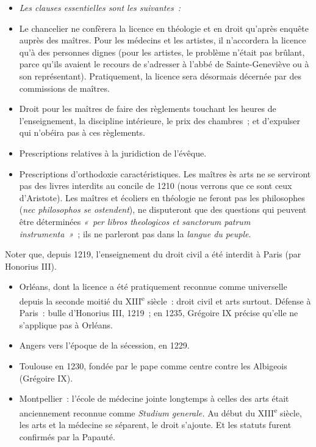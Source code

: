 \documentclass[french,twoside]{book} %
\newlength{\listmod}
\newcommand{\listhead}[1]{\hspace{-1\listmod}\emph{#1}}
\begin{document}
\begin{itemize}[itemsep=0pt,]
\item[]\listhead{Les clauses essentielles sont les suivantes :}
\item Le chancelier ne confèrera la licence en théologie et en droit qu’après enquête auprès des maîtres. Pour les médecins et les artistes, il n’accordera la licence qu’à des personnes dignes (pour les artistes, le problème n’était pas brûlant, parce qu’ils avaient le recours de s’adresser à l’abbé de Sainte-Geneviève ou à son représentant). Pratiquement, la licence sera désormais décernée par des commissions de maîtres.
\item Droit pour les maîtres de faire des règlements touchant les heures de l’enseignement, la discipline intérieure, le prix des chambres ; et d’expulser qui n’obéira pas à ces règlements.
\item Prescriptions relatives à la juridiction de l’évêque.
\item Prescriptions d’orthodoxie caractéristiques. Les maîtres ès arts ne se serviront pas des livres interdits au concile de 1210 (nous verrons que ce sont ceux d’Aristote). Les maîtres et écoliers en théologie ne feront pas les philosophes ({\itshape nec philosophos se ostendent}), ne disputeront que des questions qui peuvent être déterminées \emph{« per libros theologicos et sanctorum patrum instrumenta »} ; ils ne parleront pas dans la \emph{langue du peuple}.
\end{itemize}

\noindent Noter que, depuis 1219, l’enseignement du droit civil a été interdit à Paris (par Honorius III).\par

\begin{itemize}[itemsep=0pt,]
\item Orléans, dont la licence a été pratiquement reconnue comme universelle depuis la seconde moitié du XIII\textsuperscript{e} siècle : droit civil et  
\label{p117} arts surtout. Défense à Paris : bulle d’Honorius III, 1219 ; en 1235, Grégoire IX précise qu’elle ne s’applique pas à Orléans.
\item Angers vers l’époque de la sécession, en 1229.
\item Toulouse en 1230, fondée par le pape comme centre contre les Albigeois (Grégoire IX).
\item Montpellier : l’école de médecine jointe longtemps à celles des arts était anciennement reconnue comme {\itshape Studium generale.} Au début du XIII\textsuperscript{e} siècle, les arts et la médecine se séparent, le droit s’ajoute. Et les statuts furent confirmés par la Papauté.
\end{itemize}
\end{document}
